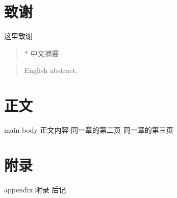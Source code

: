 \documentclass[degree=undergraduate,bibstyle=numerical,font=empty]{xmuthesis}
\begin{document}
\maketitle
\chapter*{致谢}
这里致谢
\begin{abstract}*
    中文摘要
\end{abstract}
\begin{abstract}
    English abstract. 
\end{abstract}
\xmutableofcontents %
\chapter{正文}{main body}
正文内容
\newpage
同一章的第二页
\newpage
同一章的第三页
\nocite{*} 

\appendix
\chapter{附录}{appendix}
附录
\backmatter
后记
\end{document}
